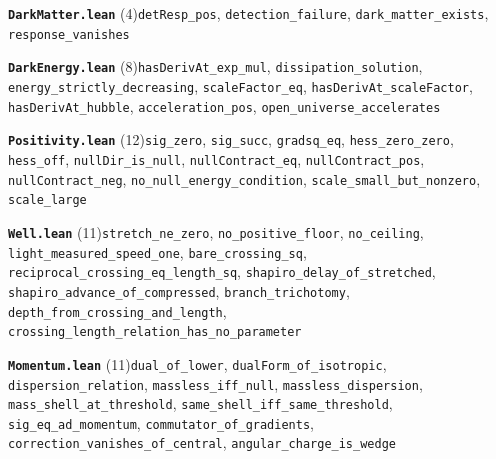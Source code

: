 \documentclass[11pt,a4paper]{article}
\theoremstyle{sudef}
\begin{document}
\noindent\textbf{\texttt{DarkMatter.lean}} (4)\quad \texttt{detResp\_\allowbreak pos}, \texttt{detection\_\allowbreak failure}, \texttt{dark\_\allowbreak matter\_\allowbreak exists}, \texttt{response\_\allowbreak vanishes}\par\smallskip
\noindent\textbf{\texttt{DarkEnergy.lean}} (8)\quad \texttt{hasDerivAt\_\allowbreak exp\_\allowbreak mul}, \texttt{dissipation\_\allowbreak solution}, \texttt{energy\_\allowbreak strictly\_\allowbreak decreasing}, \texttt{scaleFactor\_\allowbreak eq}, \texttt{hasDerivAt\_\allowbreak scaleFactor}, \texttt{hasDerivAt\_\allowbreak hubble}, \texttt{acceleration\_\allowbreak pos}, \texttt{open\_\allowbreak universe\_\allowbreak accelerates}\par\smallskip
\noindent\textbf{\texttt{Positivity.lean}} (12)\quad \texttt{sig\_\allowbreak zero}, \texttt{sig\_\allowbreak succ}, \texttt{gradsq\_\allowbreak eq}, \texttt{hess\_\allowbreak zero\_\allowbreak zero}, \texttt{hess\_\allowbreak off}, \texttt{nullDir\_\allowbreak is\_\allowbreak null}, \texttt{nullContract\_\allowbreak eq}, \texttt{nullContract\_\allowbreak pos}, \texttt{nullContract\_\allowbreak neg}, \texttt{no\_\allowbreak null\_\allowbreak energy\_\allowbreak condition}, \texttt{scale\_\allowbreak small\_\allowbreak but\_\allowbreak nonzero}, \texttt{scale\_\allowbreak large}\par\smallskip
\noindent\textbf{\texttt{Well.lean}} (11)\quad \texttt{stretch\_\allowbreak ne\_\allowbreak zero}, \texttt{no\_\allowbreak positive\_\allowbreak floor}, \texttt{no\_\allowbreak ceiling}, \texttt{light\_\allowbreak measured\_\allowbreak speed\_\allowbreak one}, \texttt{bare\_\allowbreak crossing\_\allowbreak sq}, \texttt{reciprocal\_\allowbreak crossing\_\allowbreak eq\_\allowbreak length\_\allowbreak sq}, \texttt{shapiro\_\allowbreak delay\_\allowbreak of\_\allowbreak stretched}, \texttt{shapiro\_\allowbreak advance\_\allowbreak of\_\allowbreak compressed}, \texttt{branch\_\allowbreak trichotomy}, \texttt{depth\_\allowbreak from\_\allowbreak crossing\_\allowbreak and\_\allowbreak length}, \texttt{crossing\_\allowbreak length\_\allowbreak relation\_\allowbreak has\_\allowbreak no\_\allowbreak parameter}\par\smallskip
\noindent\textbf{\texttt{Momentum.lean}} (11)\quad \texttt{dual\_\allowbreak of\_\allowbreak lower}, \texttt{dualForm\_\allowbreak of\_\allowbreak isotropic}, \texttt{dispersion\_\allowbreak relation}, \texttt{massless\_\allowbreak iff\_\allowbreak null}, \texttt{massless\_\allowbreak dispersion}, \texttt{mass\_\allowbreak shell\_\allowbreak at\_\allowbreak threshold}, \texttt{same\_\allowbreak shell\_\allowbreak iff\_\allowbreak same\_\allowbreak threshold}, \texttt{sig\_\allowbreak eq\_\allowbreak ad\_\allowbreak momentum}, \texttt{commutator\_\allowbreak of\_\allowbreak gradients}, \texttt{correction\_\allowbreak vanishes\_\allowbreak of\_\allowbreak central}, \texttt{angular\_\allowbreak charge\_\allowbreak is\_\allowbreak wedge}\par\smallskip
\end{document}
